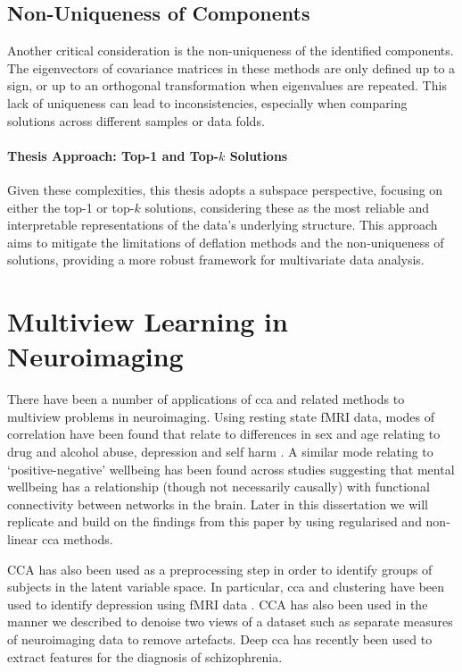 \subsection{Non-Uniqueness of Components}

Another critical consideration is the non-uniqueness of the identified components.
The eigenvectors of covariance matrices in these methods are only defined up to a sign, or up to an orthogonal transformation when eigenvalues are repeated. This lack of uniqueness can lead to inconsistencies, especially when comparing solutions across different samples or data folds.

\paragraph{Thesis Approach: Top-1 and Top-$k$ Solutions}

Given these complexities, this thesis adopts a subspace perspective, focusing on either the top-1 or top-$k$ solutions, considering these as the most reliable and interpretable representations of the data's underlying structure.
This approach aims to mitigate the limitations of deflation methods and the non-uniqueness of solutions, providing a more robust framework for multivariate data analysis.

\section{Multiview Learning in Neuroimaging}

There have been a number of applications of \acrshort{cca} and related methods to multiview problems in neuroimaging.
Using resting state fMRI data, modes of correlation have been found that relate to differences in sex and age relating to drug and alcohol abuse, depression and self harm \citep{mihalik2019brain}.
A similar mode relating to `positive-negative' wellbeing has been found across studies \citep{smith2015positive}suggesting that mental wellbeing has a relationship (though not necessarily causally) with functional connectivity between networks in the brain.
Later in this dissertation we will replicate and build on the findings from this paper by using regularised and non-linear \acrshort{cca} methods.

CCA has also been used as a preprocessing step in order to identify groups of subjects in the latent variable space.
In particular, \acrshort{cca} and clustering have been used to identify depression using fMRI data\citep{dinga2019evaluating} \citep{drysdale2017resting}.
CCA has also been used in the manner we described to denoise two \gls{views} of a dataset such as separate measures of neuroimaging data \citep{zhuang2020technical} to remove artefacts.
Deep \acrshort{cca} has recently been used to extract features for the diagnosis of schizophrenia\citep{qi2016deep}.


